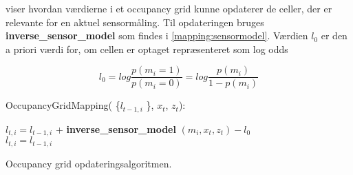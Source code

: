  viser hvordan værdierne i et occupancy grid kunne opdaterer de celler, der er relevante for en aktuel sensormåling. 
Til opdateringen bruges \textbf{inverse\_sensor\_model} som findes i \cref{mapping:sensormodel}.
Værdien $ l_0 $ er den a priori værdi for, om cellen er optaget repræsenteret som log odds

\begin{equation}
  l_0 =  log \frac{p(m_i = 1)}{p(m_i = 0)} = log \frac{p(m_i)}{1- p(m_i)}
\end{equation} 

\begin{algorithm}[H]
\LinesNumbered
OccupancyGridMapping( \{$ l_{t-1,i} $ \}, $ x_t $, $ z_t $):

{
{ $ l_{t,i} = l_{t-1,i} $ + \textbf{inverse\_sensor\_model} $( m_i, x_t, z_t ) - l_0$\\ }
{ $ l_{t,i} = l_{t-1,i}  $\\ }
}
\caption{Occupancy grid opdateringsalgoritmen.}\label{occupancygrid:alg}
\end{algorithm}




